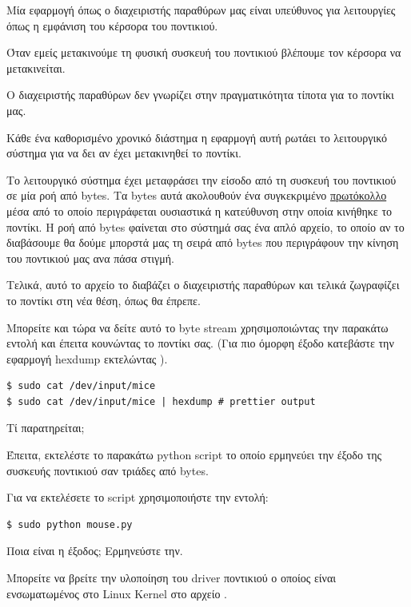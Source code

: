 \documentclass[18pt]{extarticle}
\begin{document}
\begin{question} %
Μία εφαρμογή όπως ο διαχειριστής παραθύρων μας είναι υπεύθυνος για λειτουργίες όπως η εμφάνιση του κέρσορα του ποντικιού.

Όταν εμείς μετακινούμε τη φυσική συσκευή του ποντικιού βλέπουμε τον κέρσορα να μετακινείται.

Ο διαχειριστής παραθύρων δεν γνωρίζει στην πραγματικότητα τίποτα για το ποντίκι μας. 

Κάθε ένα καθορισμένο χρονικό διάστημα η εφαρμογή αυτή ρωτάει το λειτουργικό σύστημα για να δει αν έχει μετακινηθεί το ποντίκι.

Το λειτουργικό σύστημα έχει μεταφράσει την είσοδο από τη συσκευή του ποντικιού σε μία ροή από bytes.
Τα bytes αυτά ακολουθούν ένα συγκεκριμένο \href{https://www.win.tue.nl/~aeb/linux/kbd/scancodes-13.html}{πρωτόκολλο} μέσα από το οποίο περιγράφεται ουσιαστικά η κατεύθυνση στην οποία κινήθηκε το ποντίκι.
Η ροή από bytes φαίνεται στο σύστημά σας ένα απλό αρχείο, το οποίο αν το διαβάσουμε θα δούμε μπορστά μας τη σειρά από bytes που περιγράφουν την κίνηση του ποντικιού μας ανα πάσα στιγμή.

Τελικά, αυτό το αρχείο το διαβάζει ο διαχειριστής παραθύρων και τελικά ζωγραφίζει το ποντίκι στη νέα θέση, όπως θα έπρεπε.

Μπορείτε και τώρα να δείτε αυτό το byte stream χρησιμοποιώντας την παρακάτω εντολή και έπειτα κουνώντας το ποντίκι σας.
(Για πιο όμορφη έξοδο κατεβάστε την εφαρμογή hexdump εκτελώντας ).

\begin{commandline} 
\begin{verbatim}
$ sudo cat /dev/input/mice
$ sudo cat /dev/input/mice | hexdump # prettier output
\end{verbatim}
\end{commandline}

Τί παρατηρείται;

Έπειτα, εκτελέστε το παρακάτω python script το οποίο ερμηνεύει την έξοδο της συσκευής ποντικιού σαν τριάδες από bytes.

\begin{file}[mouse.py]
        
\end{file}

Για να εκτελέσετε το script χρησιμοποιήστε την εντολή:

\begin{commandline}
\begin{verbatim}
$ sudo python mouse.py
\end{verbatim}
\end{commandline}


Ποια είναι η έξοδος; Ερμηνεύστε την.

\begin{info}[Σημείωση]
    Μπορείτε να βρείτε την υλοποίηση του driver ποντικιού ο οποίος είναι ενσωματωμένος στο Linux Kernel στο αρχείο
    .
\end{info}


\end{question}
\end{document}
